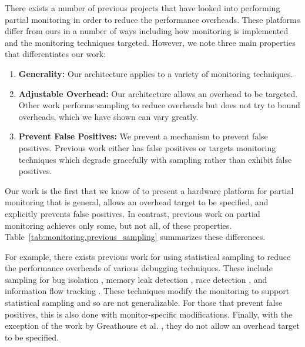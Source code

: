 There exists a number of previous projects that have looked into performing
partial monitoring in order to reduce the performance overheads. These
platforms differ from ours in a number of ways including how monitoring is
implemented and the monitoring techniques targeted. However, we note three main
properties that differentiates our work:
\begin{enumerate}
  \item \textbf{Generality:} Our architecture applies to a variety of monitoring techniques.
  \item \textbf{Adjustable Overhead:} Our architecture allows an overhead to be
  targeted. Other work performs sampling to reduce overheads but does not try
  to bound overheads, which we have shown can vary greatly.
  \item \textbf{Prevent False Positives:} We prevent a mechanism to prevent
  false positives. Previous work either has false positives or targets monitoring
  techniques which degrade gracefully with sampling rather than exhibit false
  positives.
\end{enumerate}
Our work is the first that we know of to present a hardware platform for partial
monitoring that is general, allows an overhead target to be specified, and
explicitly prevents false positives. In contrast, previous work on
partial monitoring achieves only some, but not all, of these properties.
Table~\ref{tab:monitoring.previous_sampling} summarizes these differences. 

For example, there exists previous work for using statistical sampling to
reduce the performance overheads of various debugging techniques. These include
sampling for bug isolation \cite{liblit-pldi05}, memory leak detection
\cite{chilimbi-asplos04}, race detection \cite{literace-pldi09, pacer-pldi10},
and information flow tracking \cite{testudo-micro08, greathouse-cgo11}. These
techniques modify the monitoring to support statistical sampling and so are not
generalizable. For those that prevent false positives, this is also done with
monitor-specific modifications. Finally, with the exception of the work by
Greathouse et al. \cite{greathouse-cgo11}, they do not allow an overhead target
to be specified.

